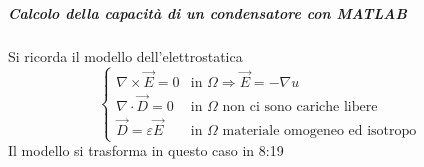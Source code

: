 
\subparagraph{Calcolo della capacità di un condensatore con MATLAB}
Si ricorda il modello dell'elettrostatica
$$
\begin{cases}
\nabla \times \vec{E} = 0 &\text{in } \Omega \Rightarrow \vec{E} = -\nabla u\\
\nabla\cdot\vec{D} = 0 &\text{in }\Omega\text{ non ci sono cariche libere}\\
\vec{D} = \varepsilon\vec{E} &\text{in } \Omega\text{ materiale omogeneo ed isotropo}
\end{cases}
$$
Il modello si trasforma in questo caso in 8:19

